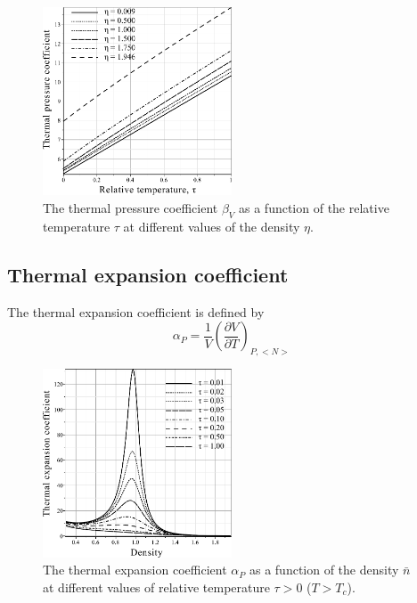 \documentclass[12pt]{article}
\begin{document}
	\begin{figure}[h!]
		\centering \includegraphics[width=0.5\textwidth]{f3c.pdf}
		\vskip-3mm\caption{The thermal pressure coefficient $\beta_V$ as a function of the relative temperature $\tau$ at different values of the density $\eta$. 
		}\label{fig3c}
	\end{figure}
	
	\subsection{Thermal expansion coefficient}
	The thermal expansion coefficient is defined by
	\begin{equation}
		\alpha_P = \frac{1}{V}\left(\frac{\partial V}{\partial T}\right)_{P,<N>}
	\end{equation}
	
	\begin{figure}[h!]
		\centering \includegraphics[width=0.5\textwidth]{f4a.pdf}
		\vskip-3mm\caption{The thermal expansion coefficient $\alpha_P$ as a function of the density $\bar n$ at different values of relative temperature $\tau > 0$ ($T > T_c$). 
		}\label{fig4a}
	\end{figure}
	
\end{document}

